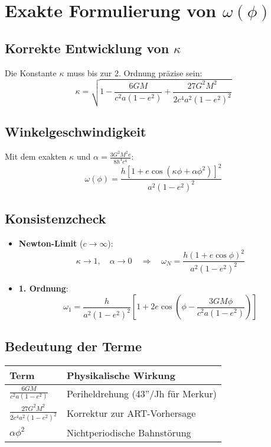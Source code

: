 \section{Exakte Formulierung von \(\omega(\phi)\)}

\subsection{Korrekte Entwicklung von \(\kappa\)}
Die Konstante \(\kappa\) muss bis zur 2. Ordnung präzise sein:
\begin{equation}
\kappa = \sqrt{1 - \frac{6GM}{c^2a(1-e^2)} + \frac{27G^2M^2}{2c^4a^2(1-e^2)^2}}
\end{equation}

\subsection{Winkelgeschwindigkeit}
Mit dem exakten \(\kappa\) und \(\alpha = \frac{3G^2M^2e}{8h^4c^4}\):
\begin{equation}
\boxed
{
    \omega(\phi) = \frac{h[1 + e\cos(\kappa\phi + \alpha\phi^2)]^2}{a^2(1-e^2)^2}
}
\end{equation}

\subsection{Konsistenzcheck}
\begin{itemize}
\item \textbf{Newton-Limit} (\(c \to \infty\)):
\begin{equation}
\kappa \to 1,\quad \alpha \to 0 \quad \Rightarrow \quad \omega_N = \frac{h(1+e\cos\phi)^2}{a^2(1-e^2)^2}
\end{equation}

\item \textbf{1. Ordnung}:
\begin{equation}
\omega_{1} = \frac{h}{a^2(1-e^2)^2}\left[1 + 2e\cos\left(\phi - \frac{3GM\phi}{c^2a(1-e^2)}\right)\right]
\end{equation}
\end{itemize}

\subsection{Bedeutung der Terme}
\begin{tabular}{|l|l|}
\hline
Term & Physikalische Wirkung \\ \hline
\(\frac{6GM}{c^2a(1-e^2)}\) & Periheldrehung (43''/Jh für Merkur) \\ \hline
\(\frac{27G^2M^2}{2c^4a^2(1-e^2)^2}\) & Korrektur zur ART-Vorhersage \\ \hline
\(\alpha\phi^2\) & Nichtperiodische Bahnstörung \\ \hline
\end{tabular}
